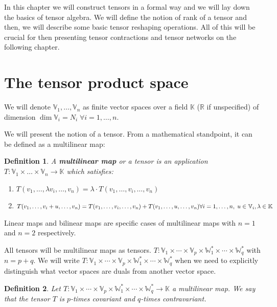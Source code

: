 \documentclass[11pt,a4paper,openright,oneside]{book}
\numberwithin{equation}{section}
\newtheorem{defn0}{Definition}[chapter]
\newenvironment{definition}{ \begin{defn0}}{\end{defn0}}
\begin{document}
\fi


In this chapter we will construct tensors in a formal way and we will lay down the basics of tensor algebra. We will
define the notion of rank of a tensor and then,
we will describe some basic tensor reshaping operations.
All of this will be crucial for then presenting tensor contractions and tensor networks on the following chapter.

\section{The tensor product space}

We will denote $\mathbb{V}_1, \dots, \mathbb{V}_n$ as finite vector spaces over a field $\mathbb{K}$ ($\mathbb{R}$ if unspecified) of dimension $\dim{\mathbb{V}_i} = N_i \; \forall i = 1, \dots, n$.

We will present the notion of a tensor. From a mathematical standpoint, it can be defined as a multilinear map:

\begin{definition}
    A \textbf{multilinear map} or a tensor is an application ${T: \mathbb{V}_1 \times \dots \times \mathbb{V}_n \rightarrow \mathbb{K}}$ which satisfies:
    \begin{enumerate}
        \item $T(v_1, \dots, \lambda v_i, \dots, v_n) = \lambda \cdot T(v_1, \dots, v_i, \dots, v_n)$
        \item $T(v_1, \dots, v_i + u, \dots, v_n) = T(v_1, \dots, v_i, \dots, v_n) + T(v_1, \dots, u, \dots, v_n) \\ {\forall i = 1, \dots, n, \; u \in \mathbb{V}_i, \lambda \in \mathbb{K}}$
    \end{enumerate}
\end{definition}

Linear maps and bilinear maps are specific cases of multilinear maps with $n=1$ and $n=2$ respectively.

All tensors will be multilinear
maps as tensors. $T: \mathbb{V}_1 \times \cdots \times \mathbb{V}_p \times \mathbb{W}_1^* \times \cdots \times \mathbb{W}_q^*$
with $n=p+q$. We will write
$T: \mathbb{V}_1 \times \cdots \times \mathbb{V}_p \times \mathbb{W}_1^* \times \cdots \times \mathbb{W}_q^*$
when we need to explicitly distinguish what vector spaces are duals from another vector space.


\begin{definition}
    Let $T: \mathbb{V}_1 \times \cdots \times \mathbb{V}_p \times \mathbb{W}_1^* \times \cdots \times \mathbb{W}_q^* \rightarrow \mathbb{K}$
    a multilinear map.
    We say that the tensor $T$ is $p$-times covariant and $q$-times contravariant.
\end{definition}
\end{document}
